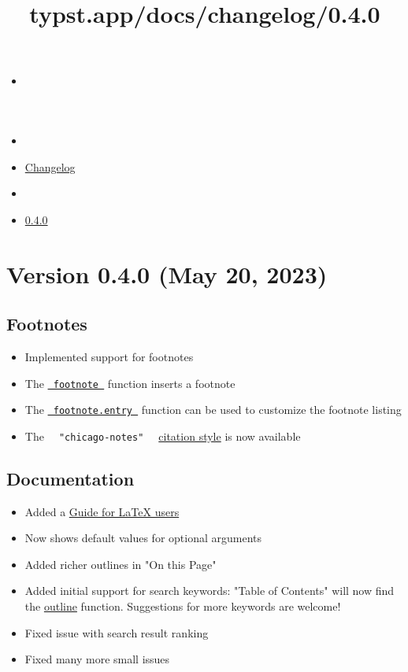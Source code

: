 \title{typst.app/docs/changelog/0.4.0}

\begin{itemize}
\tightlist
\item
  \href{/docs}{}
\item
  
\item
  \href{/docs/changelog/}{Changelog}
\item
  
\item
  \href{/docs/changelog/0.4.0/}{0.4.0}
\end{itemize}

\section{Version 0.4.0 (May 20, 2023)}\label{version-0.4.0-may-20-2023}

\subsection{Footnotes}\label{footnotes}

\begin{itemize}
\tightlist
\item
  Implemented support for footnotes
\item
  The \href{/docs/reference/model/footnote/}{\texttt{\ footnote\ }}
  function inserts a footnote
\item
  The
  \href{/docs/reference/model/footnote/\#definitions-entry}{\texttt{\ footnote.entry\ }}
  function can be used to customize the footnote listing
\item
  The \texttt{\ }{\texttt{\ "chicago-notes"\ }}\texttt{\ }
  \href{/docs/reference/model/cite/\#parameters-style}{citation style}
  is now available
\end{itemize}

\subsection{Documentation}\label{documentation}

\begin{itemize}
\tightlist
\item
  Added a \href{/docs/guides/guide-for-latex-users/}{Guide for LaTeX
  users}
\item
  Now shows default values for optional arguments
\item
  Added richer outlines in "On this Page"
\item
  Added initial support for search keywords: "Table of Contents" will
  now find the \href{/docs/reference/model/outline/}{outline} function.
  Suggestions for more keywords are welcome!
\item
  Fixed issue with search result ranking
\item
  Fixed many more small issues
\end{itemize}

